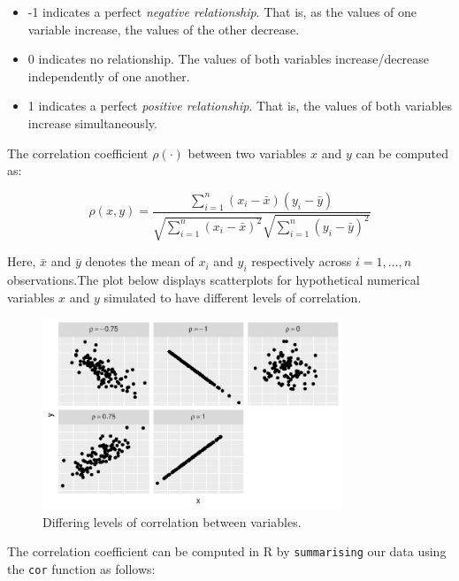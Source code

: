\documentclass[
  letterpaper,
  DIV=11,
  numbers=noendperiod]{scrartcl}
\providecommand{\tightlist}{%
  \setlength{\itemsep}{0pt}\setlength{\parskip}{0pt}}\usepackage{longtable,booktabs,array}
\begin{document}
\begin{itemize}
\tightlist
\item
  -1 indicates a perfect \emph{negative relationship}. That is, as the
  values of one variable increase, the values of the other decrease.
\item
  0 indicates no relationship. The values of both variables
  increase/decrease independently of one another.
\item
  1 indicates a perfect \emph{positive relationship}. That is, the
  values of both variables increase simultaneously.
\end{itemize}

The correlation coefficient \(\rho(\cdot)\) between two variables \(x\)
and \(y\) can be computed as:

\[
\rho (x,y) = \dfrac{\sum_{i=1}^n (x_i -\bar{x})(y_i-\bar{y})}{\sqrt{\sum_{i=1}^n (x_i-\bar{x})^2}\sqrt{\sum_{i=1}^n (y_i-\bar{y})^2}}
\]

Here, \(\bar{x}\) and \(\bar{y}\) denotes the mean of \(x_i\) and
\(y_i\) respectively across \(i= 1,\ldots,n\) observations.The plot
below displays scatterplots for hypothetical numerical variables \(x\)
and \(y\) simulated to have different levels of correlation.

\begin{figure}[H]

{\centering \includegraphics[width=0.8\textwidth,height=\textheight]{index_files/figure-pdf/correlation2-1.pdf}

}

\caption{Differing levels of correlation between variables.}

\end{figure}%

The correlation coefficient can be computed in R by \texttt{summarising}
our data using the \texttt{cor} function as follows:
\end{document}
